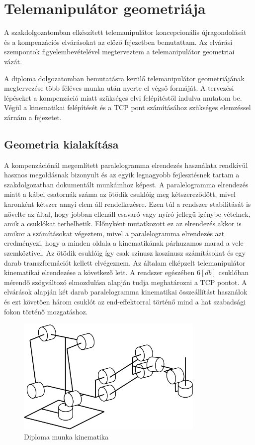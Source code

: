 \chapter{Telemanipulátor geometriája}
\label{sec:geometria}

A szakdolgozatomban elkészített telemanipulátor koncepcionális újragondolását és a kompenzációs elvárásokat az előző fejezetben bemutattam. Az elvárási szempontok figyelembevételével megterveztem a telemanipulátor geometriai vázát.

A diploma dolgozatomban bemutatásra kerülő telemanipulátor geometriájának megtervezése több féléves munka után nyerte el végső formáját. A tervezési lépéseket a kompenzáció miatt szükséges elvi felépítéstől indulva mutatom be. Végül a kinematikai felépítését és a TCP pont számításához szükséges elemzéssel zárnám a fejezetet.

\section{Geometria kialakítása}

A kompenzációnál megemlített paralelogramma elrendezés használata rendkívül hasznos megoldásnak bizonyult és az egyik legnagyobb fejlesztésnek tartam a szakdolgozatban dokumentált munkámhoz képest. A paralelogramma elrendezés
miatt a kábel csatornák száma az ötödik csuklóig meg kétszereződött, mivel karonként kétszer annyi elem áll rendelkezésre. Ezen túl a rendszer stabilitását is növelte az által, hogy jobban ellenáll csavaró vagy nyíró jellegű igénybe vételnek, amik a csuklókat terhelhetik. Előnyként mutatkozott ez az elrendezés akkor is amikor a számításokat végeztem, mivel a paralelogramma elrendezés azt eredményezi, hogy a minden oldala a kinematikának párhuzamos marad a vele szemköztivel. Az ötödik csuklóig így csak szinusz koszinusz számításokat és egy darab transzformációt kellett elvégeznem. Az általam elképzelt telemanipulátor kinematikai elrendezése a következő lett. A rendszer egészében $6[db]$ csuklóban mérendő szögváltozó elmozdulása alapján tudja meghatározni a TCP pontot. A elvárások alapján két darab paralelogramma kinematikai összeállítást használok és ezt követően három csuklót az end-effektorral történő mind a hat szabadsági fokon történő mozgatáshoz.

\begin{figure}[!ht]
\centering
\includegraphics[width=90mm, keepaspectratio]{figures/Diagrammok/Diploma_kinematika}
\caption{Diploma munka kinematika}
\label{fig:Diploma_kinematika}
\end{figure}

